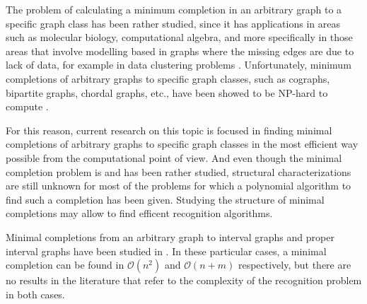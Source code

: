 \documentclass[12pt]{book}
\theoremstyle{plain}
\newcounter{cases}
\theoremstyle{remark}
\begin{document}
The problem of calculating a minimum completion in an arbitrary graph to a specific graph class has been rather studied, since it has
applications in areas such as molecular biology, computational algebra, and more specifically in those areas that involve mod\-elling 
based in graphs where the missing edges are due to lack of data, for example in data clustering problems \cite{GGKS95,NSS01}.
Unfortunately, minimum completions of arbitrary graphs to specific graph classes, such as cographs, bipartite graphs, chordal graphs, etc., 
have been showed to be NP-hard to compute \cite{NSS01,BBD06,Y81}. 

For this reason, current research on this topic is focused in finding minimal com\-ple\-tions of arbitrary graphs to specific graph classes in the most
efficient way possible from the computational point of view.
And even though the minimal completion problem is and has been rather studied, structural characterizations are still unknown for most 
of the problems for which a polynomial algorithm to find such a completion has been given. 
Studying the structure of minimal completions may allow to find efficent recognition algorithms.


Minimal completions from an arbitrary graph to interval graphs and proper interval graphs have been studied in \cite{CT13,RST06}.
In these particular cases, a minimal completion can be found in $\mathcal{O}(n^2)$ and $\mathcal{O}(n+m)$ respectively, but there are no results in the literature that refer to the complexity of the recognition problem in both cases.
\end{document}
